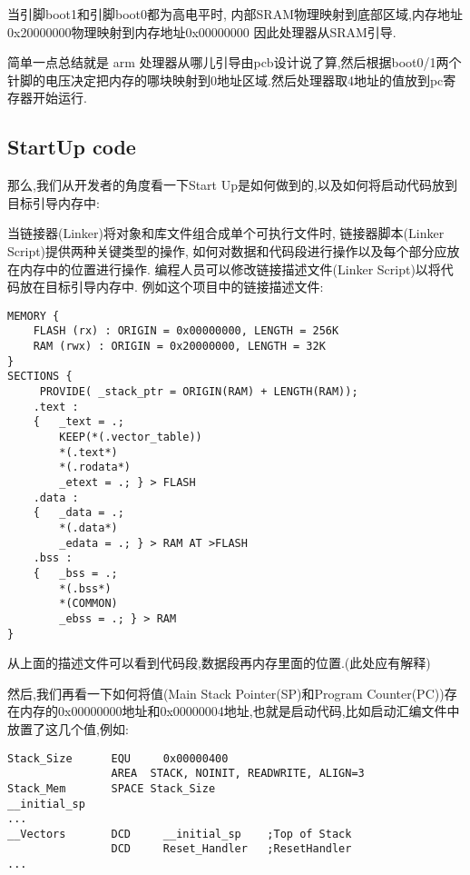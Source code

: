 当引脚boot1和引脚boot0都为高电平时,
内部SRAM物理映射到底部区域,内存地址0x20000000物理映射到内存地址0x00000000
因此处理器从SRAM引导.

简单一点总结就是 arm 处理器从哪儿引导由pcb设计说了算,然后根据boot0/1两个针脚的电压决定把内存的哪块映射到0地址区域.然后处理器取4地址的值放到pc寄存器开始运行.

\subsection{StartUp code}

那么,我们从开发者的角度看一下Start Up是如何做到的,以及如何将启动代码放到目标引导内存中:

当链接器(Linker)将对象和库文件组合成单个可执行文件时,
链接器脚本(Linker Script)提供两种关键类型的操作,
如何对数据和代码段进行操作以及每个部分应放在内存中的位置进行操作.
编程人员可以修改链接描述文件(Linker Script)以将代码放在目标引导内存中.
例如这个项目中的链接描述文件:

\begin{lstlisting}[language={[ANSI]C},keywordstyle=\color{blue!70},commentstyle=\color{red!50!green!50!blue!50},frame=shadowbox, rulesepcolor=\color{red!20!green!20!blue!20}]
MEMORY {
    FLASH (rx) : ORIGIN = 0x00000000, LENGTH = 256K
    RAM (rwx) : ORIGIN = 0x20000000, LENGTH = 32K
}
SECTIONS { 
     PROVIDE( _stack_ptr = ORIGIN(RAM) + LENGTH(RAM));
    .text :
    {   _text = .;
        KEEP(*(.vector_table))
        *(.text*)
        *(.rodata*)
        _etext = .; } > FLASH
    .data : 
    {   _data = .;
        *(.data*)  
        _edata = .; } > RAM AT >FLASH
    .bss :
    {   _bss = .;
        *(.bss*)
        *(COMMON)       
        _ebss = .; } > RAM
}
\end{lstlisting}

从上面的描述文件可以看到代码段,数据段再内存里面的位置.(此处应有解释)


然后,我们再看一下如何将值(Main Stack Pointer(SP)和Program Counter(PC))存在内存的0x00000000地址和0x00000004地址,也就是启动代码,比如启动汇编文件中放置了这几个值,例如:
\begin{lstlisting}[language={[ANSI]C},keywordstyle=\color{blue!70},commentstyle=\color{red!50!green!50!blue!50},frame=shadowbox, rulesepcolor=\color{red!20!green!20!blue!20}]
Stack_Size      EQU     0x00000400
                AREA  STACK, NOINIT, READWRITE, ALIGN=3
Stack_Mem       SPACE Stack_Size
__initial_sp
...
__Vectors       DCD     __initial_sp    ;Top of Stack
                DCD     Reset_Handler   ;ResetHandler
...
\end{lstlisting}

